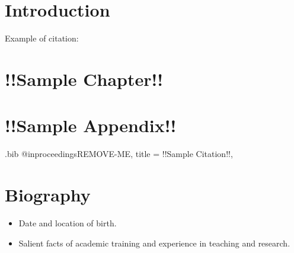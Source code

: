 \documentclass[12pt, oneside]{book}
\begin{document}
\tableofcontents
\listoftables
\listoffigures

\mainmatter

\chapter{Introduction}

Example of citation: \cite{REMOVE-ME} %

\lipsum %

\chapter{!!Sample Chapter!!}

\lipsum %

\appendix

\chapter{!!Sample Appendix!!}

\lipsum %

\backmatter

\begin{filecontents*}{\jobname.bib}
@inproceedings{REMOVE-ME,
  title = {!!Sample Citation!!},
} 
\end{filecontents*}



\chapter{Biography}

\begin{itemize}
  \item Date and location of birth.
  \item Salient facts of academic training and experience in teaching and research.
\end{itemize}
\end{document}

